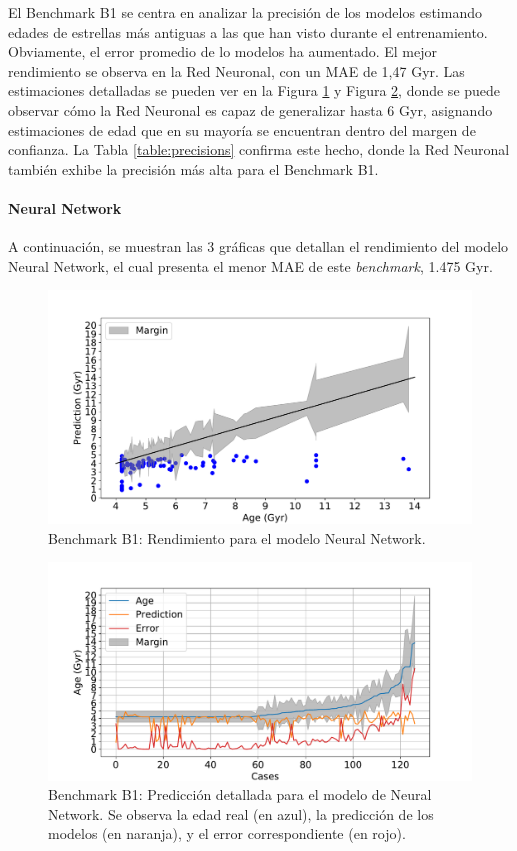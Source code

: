 El Benchmark B1 se centra en analizar la precisión de los modelos estimando edades de estrellas más antiguas a las que han visto durante el entrenamiento. Obviamente, el error promedio de lo modelos ha aumentado. El mejor rendimiento se observa en la Red Neuronal, con un MAE de 1,47 Gyr. Las estimaciones detalladas se pueden ver en la Figura \ref{fig:benchB1_best_1} y Figura \ref{fig:benchB1_best_2}, donde se puede observar cómo la Red Neuronal es capaz de generalizar hasta 6 Gyr, asignando estimaciones de edad que en su mayoría se encuentran dentro del margen de confianza. La Tabla \ref{table:precisions} confirma este hecho, donde la Red Neuronal también exhibe la precisión más alta para el Benchmark B1.

\paragraph{Neural Network} 
A continuación, se muestran las 3 gráficas que detallan el rendimiento del modelo Neural Network, el cual presenta el menor MAE de este \emph{benchmark}, 1.475 Gyr.

\begin{figure}[H]
\begin{center}
 \includegraphics[width=0.8\linewidth]{Figuras/Experimentos/B_B1_nnet_1.pdf}
\end{center}
\caption{Benchmark B1: Rendimiento para el modelo Neural Network.}
 \label{fig:benchB1_best_1}
\end{figure}

\begin{figure}[H]
\begin{center}
 \includegraphics[width=0.8\linewidth]{Figuras/Experimentos/B_B1_nnet_2.pdf}
\end{center}
\caption{Benchmark B1: Predicción detallada para el modelo de Neural Network. Se observa la edad real (en azul), la predicción de los modelos (en naranja), y el error correspondiente (en rojo).}
 \label{fig:benchB1_best_2}
\end{figure}

